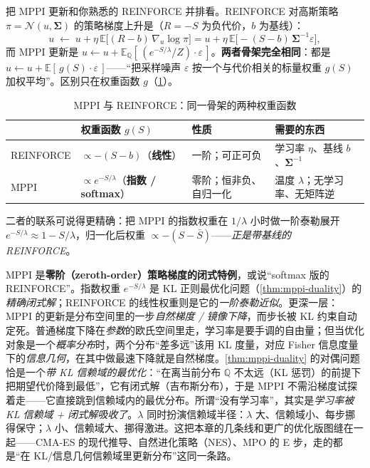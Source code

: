 把 MPPI 更新和你熟悉的 REINFORCE 并排看。REINFORCE 对高斯策略 $\pi=\mathcal{N}(u,\boldsymbol{\Sigma})$ 的策略梯度上升是（$R=-S$ 为负代价，$b$ 为基线）\cite{williams1992simple}：
\begin{equation}
  u\;\leftarrow\;u+\eta\,\mathbb{E}\big[(R-b)\,\nabla_u\log\pi\big]=u+\eta\,\mathbb{E}\big[-(S-b)\,\boldsymbol{\Sigma}^{-1}\varepsilon\big],
  \label{eq:mppi-reinforce}
\end{equation}
而 MPPI 更新是 $u\leftarrow u+\mathbb{E}_{\mathbb{Q}}[\,(e^{-S/\lambda}/Z)\cdot\varepsilon\,]$。\textbf{两者骨架完全相同}：都是 $u\leftarrow u+\mathbb{E}[\,g(S)\cdot\varepsilon\,]$——“把采样噪声 $\varepsilon$ 按一个与代价相关的标量权重 $g(S)$ 加权平均”。区别只在权重函数 $g$（\cref{tab:mppi-reinforce}）。

\begin{table}[H]\centering\small
\caption{MPPI 与 REINFORCE：同一骨架的两种权重函数}
\label{tab:mppi-reinforce}
\begin{tabular}{llll}
\toprule
 & 权重函数 $g(S)$ & 性质 & 需要的东西 \\
\midrule
REINFORCE & $\propto-(S-b)$（\textbf{线性}） & 一阶；可正可负 & 学习率 $\eta$、基线 $b$、$\boldsymbol{\Sigma}^{-1}$ \\
MPPI & $\propto e^{-S/\lambda}$（\textbf{指数 / softmax}） & 零阶；恒非负、自归一化 & 温度 $\lambda$；无学习率、无矩阵逆 \\
\bottomrule
\end{tabular}
\end{table}

\noindent 二者的联系可说得更精确：把 MPPI 的指数权重在 $1/\lambda$ 小时做一阶泰勒展开 $e^{-S/\lambda}\approx1-S/\lambda$，归一化后权重 $\propto-(S-\bar S)$——\emph{正是带基线的 REINFORCE}。

\begin{insight}[MPPI = 零阶策略梯度的闭式特例；为什么没有学习率]
MPPI 是\textbf{零阶（zeroth-order）策略梯度的闭式特例}，或说“softmax 版的 REINFORCE”。指数权重 $e^{-S/\lambda}$ 是 KL 正则最优化问题（\cref{thm:mppi-duality}）的\emph{精确闭式解}；REINFORCE 的线性权重则是它的\emph{一阶泰勒近似}。更深一层：MPPI 的更新是分布空间里的一步\emph{自然梯度 / 镜像下降}，而步长被 KL 约束自动定死。普通梯度下降在\emph{参数}的欧氏空间里走，学习率是要手调的自由量；但当优化对象是一个\emph{概率分布}时，两个分布“差多远”该用 KL 度量，对应 Fisher 信息度量下的\emph{信息几何}，在其中做最速下降就是自然梯度。\cref{thm:mppi-duality} 的对偶问题恰是一个\emph{带 KL 信赖域的最优化}：“在离当前分布 $\mathbb{Q}$ 不太远（KL 惩罚）的前提下把期望代价降到最低”，它有闭式解（吉布斯分布），于是 MPPI 不需沿梯度试探着走——它直接跳到信赖域内的最优分布。所谓“没有学习率”，其实是\emph{学习率被 KL 信赖域 + 闭式解吸收了}。$\lambda$ 同时扮演信赖域半径：$\lambda$ 大、信赖域小、每步挪得保守；$\lambda$ 小、信赖域大、挪得激进。这把本章的几条线和更广的优化版图缝在一起——CMA-ES 的现代推导、自然进化策略（NES）、MPO 的 E 步，走的都是“在 KL/信息几何信赖域里更新分布”这同一条路。
\end{insight}

